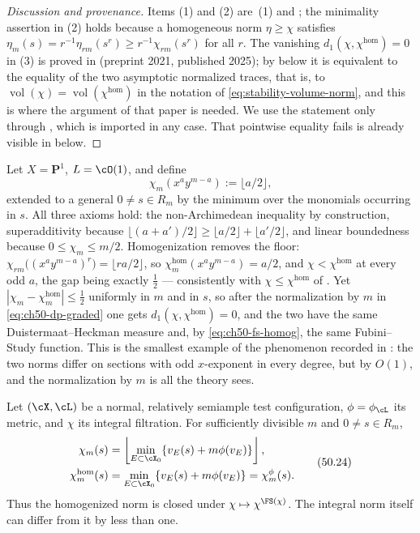 \begin{proof}[Discussion and provenance]
Items (1) and (2) are \,(1) and
; the minimality assertion in (2) holds
because a homogeneous norm $\eta\ge\chi$ satisfies
$\eta_m(s)=r^{-1}\eta_{rm}(s^r)\ge r^{-1}\chi_{rm}(s^r)$ for all $r$.
The vanishing $d_1(\chi,\chi^{\hom})=0$ in (3) is
proved in \cite{BJKS1} (preprint 2021, published 2025); by
 below it is equivalent to the equality of the
two asymptotic normalized traces, that is, to
$\operatorname{vol}(\chi)=\operatorname{vol}(\chi^{\hom})$ in the
notation of \eqref{eq:stability-volume-norm}, and this is where the
argument of that paper is needed.  We use the statement only through
, which is imported in any case.  That
pointwise equality fails is already visible in
 below.
\end{proof}

\begin{example}
\label{ex:ch50-nonhomogeneous}
Let $X=\mathbf P^1$, $L=\cO(1)$, and define
\[
 \chi_m(x^ay^{m-a}):=\bigl\lfloor a/2\bigr\rfloor,
\]
extended to a general $0\ne s\in R_m$ by the minimum over the monomials
occurring in $s$.  All three axioms hold: the non-Archimedean inequality
by construction, superadditivity because
$\lfloor(a+a')/2\rfloor\ge\lfloor a/2\rfloor+\lfloor a'/2\rfloor$, and
linear boundedness because $0\le\chi_m\le m/2$.  Homogenization removes
the floor: $\chi_{rm}\bigl((x^ay^{m-a})^r\bigr)=\lfloor ra/2\rfloor$, so
$\chi^{\hom}_m(x^ay^{m-a})=a/2$, and $\chi<\chi^{\hom}$ at every odd
$a$, the gap being exactly $\tfrac12$ --- consistently with
$\chi\le\chi^{\hom}$ of .  Yet
$|\chi_m-\chi^{\hom}_m|\le\tfrac12$ uniformly in $m$ and in $s$, so
after the normalization by $m$ in \eqref{eq:ch50-dp-graded} one gets
$d_1(\chi,\chi^{\hom})=0$, and the two have the same
Duistermaat--Heckman measure and, by \eqref{eq:ch50-fs-homog}, the same
Fubini--Study function.  This is the
smallest example of the phenomenon recorded in
: the two norms differ on sections with odd $x$-exponent in every degree,
but by $O(1)$, and the normalization by $m$ is all the theory sees.
\end{example}

\begin{lemma}
\label{lem:ch50-model-norm}
Let $(\cX,\cL)$ be a normal, relatively semiample test configuration,
$\phi=\phi_\cL$ its metric, and $\chi$ its integral filtration.
For sufficiently divisible $m$ and $0\ne s\in R_m$,
\[
 \begin{aligned}
 \chi_m(s)&=\left\lfloor\min_{E\subset\cX_0}
             \{v_E(s)+m\phi(v_E)\}\right\rfloor,\\
 \chi^{\hom}_m(s)&=\min_{E\subset\cX_0}
             \{v_E(s)+m\phi(v_E)\}=\chi^\phi_m(s).
 \end{aligned}
\tag{50.24}\label{eq:ch50-model-norm}
\]
Thus the homogenized norm is closed under $\chi\mapsto\chi^{\FS(\chi)}$.
The integral norm itself can differ from it by less than one.
\end{lemma}

